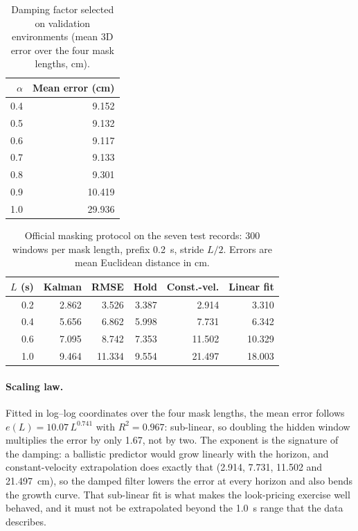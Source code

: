 \documentclass{swmcmthesis}
\begin{document}
\begin{table}[tbp]\centering\footnotesize
\caption{Damping factor selected on validation environments (mean 3D error over the four mask lengths, cm).}\label{tab:p2alpha}
\begin{tabular}{rr}
\toprule
$\alpha$ & Mean error (cm) \\
\midrule
0.4 & 9.152 \\
0.5 & 9.132 \\
0.6 & 9.117 \\
0.7 & 9.133 \\
0.8 & 9.301 \\
0.9 & 10.419 \\
1.0 & 29.936 \\
\bottomrule
\end{tabular}
\end{table}

\begin{table}[tbp]\centering\footnotesize
\caption{Official masking protocol on the seven test records: 300 windows per mask length, prefix 0.2~s, stride $L/2$. Errors are mean Euclidean distance in cm.}\label{tab:p2mask}
\begin{tabular}{rrrrrr}
\toprule
$L$ (s) & Kalman & RMSE & Hold & Const.-vel. & Linear fit \\
\midrule
0.2 & 2.862 & 3.526 & 3.387 & 2.914 & 3.310 \\
0.4 & 5.656 & 6.862 & 5.998 & 7.731 & 6.342 \\
0.6 & 7.095 & 8.742 & 7.353 & 11.502 & 10.329 \\
1.0 & 9.464 & 11.334 & 9.554 & 21.497 & 18.003 \\
\bottomrule
\end{tabular}
\end{table}

\paragraph{Scaling law.} Fitted in log--log coordinates over the four mask lengths, the mean error follows $e(L)=10.07\,L^{0.741}$ with $R^2=0.967$: sub-linear, so doubling the hidden window multiplies the error by only 1.67, not by two. The exponent is the signature of the damping: a ballistic predictor would grow linearly with the horizon, and constant-velocity extrapolation does exactly that (2.914, 7.731, 11.502 and 21.497~cm), so the damped filter lowers the error at every horizon and also bends the growth curve. That sub-linear fit is what makes the look-pricing exercise well behaved, and it must not be extrapolated beyond the 1.0~s range that the data describes.
\end{document}
